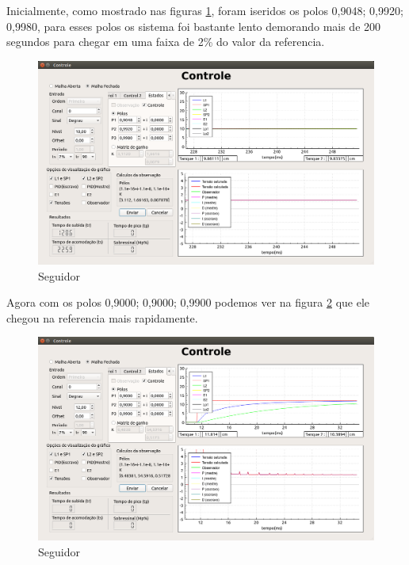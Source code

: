 \documentclass[a4paper,12pt]{article}
\begin{document}
\hspace{4ex}Inicialmente, como mostrado nas figuras \ref{img1}, foram iseridos os polos 0,9048; 0,9920; 0,9980, para esses polos os sistema foi bastante lento demorando mais de 200 segundos para chegar em uma faixa de 2\% do valor da referencia.
\begin{figure}[H]
\centering
\includegraphics[width=13cm]{FotosSeguidor/PolosDados.png}
\caption{Seguidor}
\label{img1}
\end{figure}

\hspace{4ex}Agora com os polos 0,9000; 0,9000; 0,9900 podemos ver na figura \ref{img3} que ele chegou na referencia mais rapidamente.
\begin{figure}[!h]
\centering
\includegraphics[width=13cm]{FotosSeguidor/Bom}
\caption{Seguidor}
\label{img3}
\end{figure}
\end{document}
